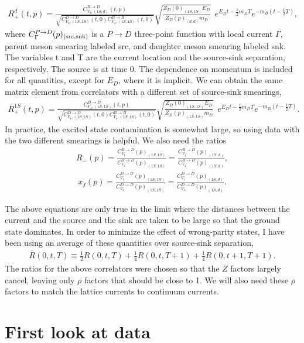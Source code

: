 \documentclass[11pt]{article}
\def\bea{\begin{eqnarray}}
\def\eea{\end{eqnarray}}
\begin{document}
\bea\label{eq:Rplus_d} R_{+}^d(t,p) = \frac{C^{B\to D}_{V_4,(1S,d)}(t,p)}{\sqrt{C^{D\to D}_{V_4,(1S,1S)}(t,0) C^{B\to B}_{V_4,(1S,1S)}(t,0)}}\sqrt{\frac{Z_D(0)_{(1S,1S)}E_D}{Z_D(p)_{(d,d)}m_D}} \ \ e^{E_D t-\frac{1}{2}m_DT}e^{-m_B(t-\frac{1}{2}T)},
\eea
%
where $C^{P\to D}_{\Gamma}(p)_{\rm (src,snk)}$ is a $P\to D$ three-point function with local current $\Gamma$, parent meson smearing labeled src, and daughter meson smearing labeled snk.  The variables t and T are the current location and the source-sink separation, respectively.  The source is at time 0.  The dependence on momentum is included for all quantities, except for $E_D$, where it is implicit.  We can obtain the same matrix element from correlators with a different set of source-sink smearings,  
%
\bea\label{eq:Rplus_1S} R_{+}^{1S}(t,p) = \frac{C^{B\to D}_{V_4,(1S,1S)}(t,p)}{\sqrt{C^{D\to D}_{V_4,(1S,1S)}(t,0) C^{B\to B}_{V_4,(1S,1S)}(t,0)}}\sqrt{\frac{Z_D(0)_{(1S,1S)}E_D}{Z_D(p)_{(1S,1S)}m_D}} \ \ e^{E_D t-\frac{1}{2}m_DT}e^{-m_B(t-\frac{1}{2}T)}.
\eea
%
In practice, the excited state contamination is somewhat large, so using data with the two different smearings is helpful.  We also need the ratios
%
\bea R_{-}(p)=\frac{C^{B\to D}_{V_1}(p)_{(1S,1S)}}{C^{B\to D}_{V_4}(p)_{(1S,1S)}}=\frac{C^{B\to D}_{V_1}(p)_{(1S,d)}}{C^{B\to D}_{V_4}(p)_{(1S,d)}},
\eea
%
\bea x_f(p)=\frac{C^{D\to D}_{V_1}(p)_{(1S,1S)}}{C^{D\to D}_{V_4}(p)_{(1S,1S)}}=\frac{C^{D\to D}_{V_1}(p)_{(1S,d)}}{C^{D\to D}_{V_4}(p)_{(1S,d)}}.
\eea

The above equations are only true in the limit where the distances between the current and the source and the sink are taken to be large so that the ground state dominates.  In order to minimize the effect of wrong-parity states, I have been using an average of these quantities over source-sink separation,
%
\bea \overline{R}(0,t,T) \equiv \frac{1}{2}R(0,t,T)+\frac{1}{4}R(0,t,T+1)+\frac{1}{4}R(0,t+1,T+1).
\eea
%
The ratios for the above correlators were chosen so that the $Z$ factors largely cancel, leaving only $\rho$ factors that should be close to 1.  We will also need these $\rho$ factors to match the lattice currents to continuum currents.

\section{First look at data}
\end{document}
